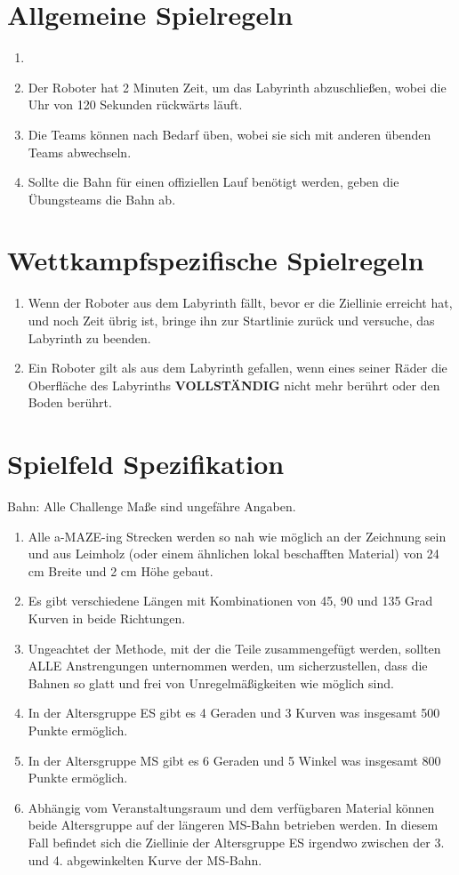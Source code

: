 \documentclass[a4paper,12pt]{article}
\begin{document}
\section{Allgemeine Spielregeln}
\begin{enumerate}
	\item \scoreRuns
	\item Der Roboter hat 2 Minuten Zeit, um das Labyrinth abzuschließen,
		wobei die Uhr von 120 Sekunden rückwärts läuft.
	\item Die Teams können nach Bedarf üben, wobei sie sich mit anderen
		übenden Teams abwechseln.
	\item Sollte die Bahn für einen offiziellen Lauf benötigt werden, geben
		die Übungsteams die Bahn ab.
\end{enumerate}

\section{Wettkampfspezifische Spielregeln}
\begin{enumerate}
	\item Wenn der Roboter aus dem Labyrinth fällt, bevor er die Ziellinie
		erreicht hat, und noch Zeit übrig ist, bringe ihn zur
		Startlinie zurück und versuche, das Labyrinth zu beenden.
	\item Ein Roboter gilt als aus dem Labyrinth gefallen, wenn eines
		seiner Räder die Oberfläche des Labyrinths \textbf{VOLLSTÄNDIG}
		nicht mehr berührt oder den Boden berührt.
\end{enumerate}

\section{Spielfeld Spezifikation}

Bahn: Alle Challenge Maße sind ungefähre Angaben.
\begin{enumerate}
	\item Alle a-MAZE-ing Strecken werden so nah wie möglich an der
		Zeichnung sein und aus Leimholz (oder einem ähnlichen lokal
		beschafften Material) von 24 cm Breite und 2 cm Höhe gebaut.
	\item Es gibt verschiedene Längen mit Kombinationen von 45, 90 und 135
		Grad Kurven in beide Richtungen.
	\item Ungeachtet der Methode, mit der die Teile zusammengefügt werden,
		sollten ALLE Anstrengungen unternommen werden, um
		sicherzustellen, dass die Bahnen so glatt und frei von
		Unregelmäßigkeiten wie möglich sind.
	\item In der Altersgruppe ES gibt es 4 Geraden und 3 Kurven was
		insgesamt 500 Punkte ermöglich.
	\item In der Altersgruppe MS gibt es 6 Geraden und 5 Winkel was
		insgesamt 800 Punkte ermöglich.
	\item Abhängig vom Veranstaltungsraum und dem verfügbaren Material
		können beide Altersgruppe auf der längeren MS-Bahn betrieben
		werden. In diesem Fall befindet sich die Ziellinie der
		Altersgruppe ES irgendwo zwischen der 3. und 4. abgewinkelten
		Kurve der MS-Bahn.
\end{enumerate}
\end{document}
